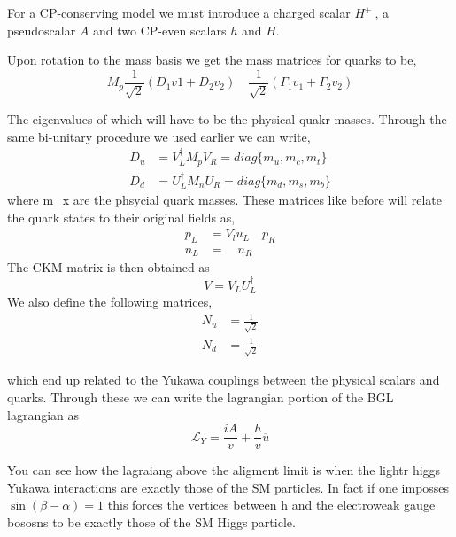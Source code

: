 For a CP-conserving model we must introduce a charged scalar $H^+~$, a pseudoscalar $A$ and two CP-even scalars $h$ and $H$.  

Upon rotation to the mass basis we get the mass matrices for quarks to be, 
\begin{equation}
M_p \frac{1}{\sqrt{2}} \left( D_1 v1 + D_2 v_2 \right) \quad \frac{1}{\sqrt{2}}\left( \Gamma_1 v_1 + \Gamma_2 v_2 \right)   
\end{equation}

The eigenvalues of which will have to be the physical quakr masses. Through the same bi-unitary procedure we used earlier we can write, 
\begin{equation}
\begin{split}
D_u & = V_L^\dagger M_p V_R = diag\{ m_u , m_c ,  m_t \} \\
D_d & = U_L^\dagger M_n U_R = diag\{ m_d , m_s , m_b \}  
\end{split} 
\end{equation}
where m_x are the phsycial quark masses. These matrices like before will relate the quark states to their original fields as, 
\begin{equation}
\begin{split}
p_L & = V_l u_L \quad p_R \\
n_L & = \quad n_R 
\end{split} 
\end{equation}
The CKM matrix is then obtained as 
\begin{equation}
V= V_L U_L^\dagger
\end{equation}
We also define the following matrices, 
\begin{equation}
\begin{split}
N_u & = \frac{1}{\sqrt{2}} \\ 
N_d & = \frac{1}{\sqrt{2}}
\end{split} 
\end{equation}

which end up related to the Yukawa couplings between the physical scalars and quarks. Through these we can write the lagrangian portion of the BGL lagrangian as 
\begin{equation}
\mathcal{L}_Y = \frac{i A}{v} + \frac{h}{v} \overline{u}
\end{equation}

You can see how the lagraiang above the aligment limit is when the lightr higgs Yukawa interactions are exactly those of the SM particles. In fact if one imposses $\sin(\beta -\alpha) = 1$ this forces the vertices between h and the electroweak gauge bososns to be exactly those of the SM Higgs particle. 

